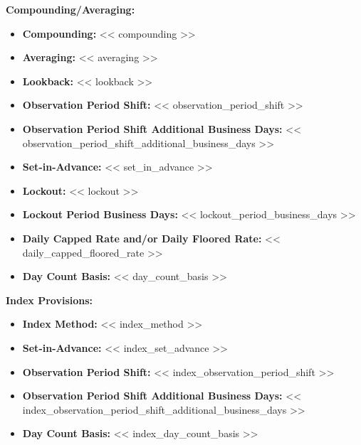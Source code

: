 \documentclass[11pt, a4paper]{article}
\newcommand{\templatetag}[1]{} %
\begin{document}
\templatetag{<<- if compounding_averaging_applicable >>}
\vspace{0.15cm}
\noindent \textbf{Compounding/Averaging:}
\begin{itemize}[leftmargin=2cm, label={}, itemsep=1pt]
\templatetag{<<- if compounding >>}
    \item \textbf{Compounding:} << compounding >>
\templatetag{<<- endif >>}
\templatetag{<<- if averaging >>}
    \item \textbf{Averaging:} << averaging >>
\templatetag{<<- endif >>}
\templatetag{<<- if lookback >>}
    \item \textbf{Lookback:} << lookback >>
\templatetag{<<- endif >>}
\templatetag{<<- if observation_period_shift >>}
    \item \textbf{Observation Period Shift:} << observation_period_shift >>
\templatetag{<<- endif >>}
\templatetag{<<- if observation_period_shift_additional_business_days >>}
    \item \textbf{Observation Period Shift Additional Business Days:} << observation_period_shift_additional_business_days >>
\templatetag{<<- endif >>}
    \item \textbf{Set-in-Advance:} << set_in_advance >>
\templatetag{<<- if lockout >>}
    \item \textbf{Lockout:} << lockout >>
\templatetag{<<- endif >>}
\templatetag{<<- if lockout_period_business_days >>}
    \item \textbf{Lockout Period Business Days:} << lockout_period_business_days >>
\templatetag{<<- endif >>}
\templatetag{<<- if daily_capped_floored_rate >>}
    \item \textbf{Daily Capped Rate and/or Daily Floored Rate:} << daily_capped_floored_rate >>
\templatetag{<<- endif >>}
    \item \textbf{Day Count Basis:} << day_count_basis >>
\end{itemize}
\templatetag{<<- endif >>}

\templatetag{<<- if index_provisions_applicable >>}
\vspace{0.15cm}
\noindent \textbf{Index Provisions:}
\begin{itemize}[leftmargin=2cm, label={}, itemsep=1pt]
    \item \textbf{Index Method:} << index_method >>
    \item \textbf{Set-in-Advance:} << index_set_advance >>
    \item \textbf{Observation Period Shift:} << index_observation_period_shift >>
\templatetag{<<- if index_observation_period_shift_additional_business_days >>}
    \item \textbf{Observation Period Shift Additional Business Days:} << index_observation_period_shift_additional_business_days >>
\templatetag{<<- endif >>}
    \item \textbf{Day Count Basis:} << index_day_count_basis >>
\end{itemize}
\templatetag{<<- endif >>}
\end{document}

